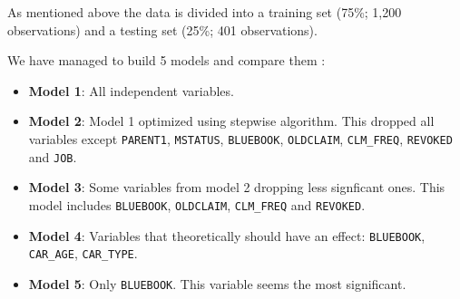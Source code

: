 \documentclass[]{article}
\providecommand{\tightlist}{%
  \setlength{\itemsep}{0pt}\setlength{\parskip}{0pt}}
\begin{document}
As mentioned above the data is divided into a training set (75\%; 1,200
observations) and a testing set (25\%; 401 observations).

We have managed to build 5 models and compare them :

\begin{itemize}
\tightlist
\item
  \textbf{Model 1}: All independent variables.
\item
  \textbf{Model 2}: Model 1 optimized using stepwise algorithm. This
  dropped all variables except \texttt{PARENT1}, \texttt{MSTATUS},
  \texttt{BLUEBOOK}, \texttt{OLDCLAIM}, \texttt{CLM\_FREQ},
  \texttt{REVOKED} and \texttt{JOB}.
\item
  \textbf{Model 3}: Some variables from model 2 dropping less signficant
  ones. This model includes \texttt{BLUEBOOK}, \texttt{OLDCLAIM},
  \texttt{CLM\_FREQ} and \texttt{REVOKED}.
\item
  \textbf{Model 4}: Variables that theoretically should have an effect:
  \texttt{BLUEBOOK}, \texttt{CAR\_AGE}, \texttt{CAR\_TYPE}.
\item
  \textbf{Model 5}: Only \texttt{BLUEBOOK}. This variable seems the most
  significant.
\end{itemize}
\end{document}
